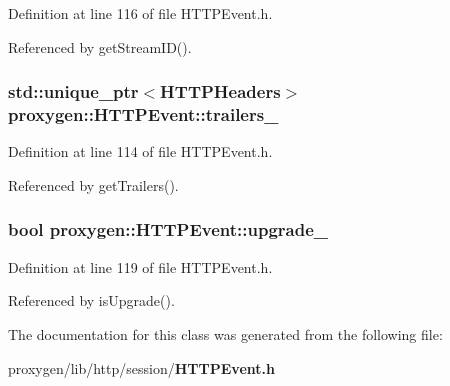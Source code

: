 Definition at line 116 of file H\+T\+T\+P\+Event.\+h.



Referenced by get\+Stream\+I\+D().

\subsubsection[{trailers\+\_\+}]{\setlength{\rightskip}{0pt plus 5cm}std\+::unique\+\_\+ptr$<${\bf H\+T\+T\+P\+Headers}$>$ proxygen\+::\+H\+T\+T\+P\+Event\+::trailers\+\_\+\hspace{0.3cm}{\ttfamily [private]}}\label{classproxygen_1_1HTTPEvent_aac7cc31eb40659f7c85aff90107bf3ae}


Definition at line 114 of file H\+T\+T\+P\+Event.\+h.



Referenced by get\+Trailers().

\subsubsection[{upgrade\+\_\+}]{\setlength{\rightskip}{0pt plus 5cm}bool proxygen\+::\+H\+T\+T\+P\+Event\+::upgrade\+\_\+\hspace{0.3cm}{\ttfamily [private]}}\label{classproxygen_1_1HTTPEvent_a75a53ae67f3ce73836047d80d4f0af3c}


Definition at line 119 of file H\+T\+T\+P\+Event.\+h.



Referenced by is\+Upgrade().



The documentation for this class was generated from the following file\+:\begin{DoxyCompactItemize}
\item 
proxygen/lib/http/session/{\bf H\+T\+T\+P\+Event.\+h}\end{DoxyCompactItemize}
